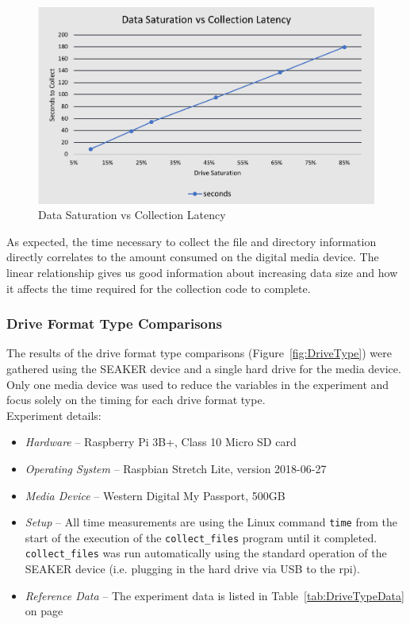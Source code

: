 \documentclass[12pt]{article}
\begin{document}
\begin{figure}[H]
  \begin{center}
  \includegraphics[width=13cm]{images/SaturationVsLatency.png}
  \caption{Data Saturation vs Collection Latency}
  \label{fig:SaturationLatency}
  \end{center}
\end{figure}

As expected, the time necessary to collect the file and directory information directly
correlates to the amount consumed on the digital media device.  The linear relationship
gives us good information about increasing data size and how it affects the time required
for the collection code to complete.\\

\subsubsection{Drive Format Type Comparisons}

The results of the drive format type comparisons (Figure~\ref{fig:DriveType}) were
gathered using the SEAKER device and a single hard drive for the media device.  Only
one media device was used to reduce the variables in the experiment and focus solely
on the timing for each drive format type.\\

Experiment details:

\begin{itemize}
  \item {\em Hardware} -- Raspberry Pi 3B+, Class 10 Micro SD card
  \item {\em Operating System} -- Raspbian Stretch Lite, version 2018-06-27
  \item {\em Media Device} -- Western Digital My Passport\texttrademark, 500GB
  \item {\em Setup} -- All time measurements are using the Linux 
  command \verb|time| from the start of the execution of the \verb|collect_files|
  program until it completed.  \verb|collect_files| was run automatically
  using the standard operation of the SEAKER device (i.e. plugging in the hard
  drive via USB to the \gls{rpi}).
  \item {\em Reference Data} -- The experiment data is listed in
  Table~\ref{tab:DriveTypeData} on page~\pageref{tab:DriveTypeData}
\end{itemize}
\end{document}
